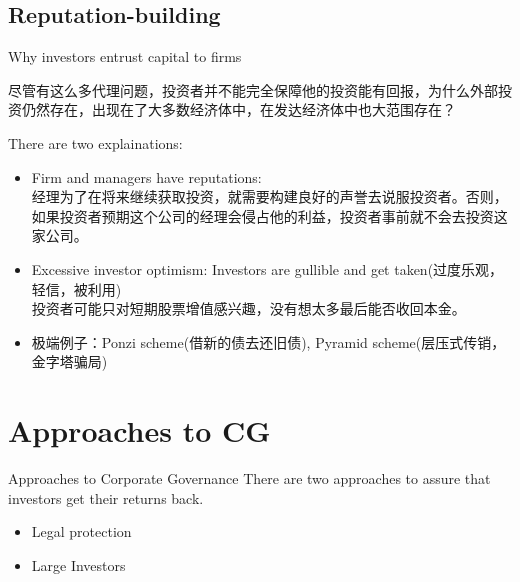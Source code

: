 \subsection{Reputation-building}
	\begin{frame}{Why investors entrust capital to firms}

尽管有这么多代理问题，投资者并不能完全保障他的投资能有回报，为什么外部投资仍然存在，出现在了大多数经济体中，在发达经济体中也大范围存在？
\end{frame}

	\begin{frame}
There are two explainations:
		\begin{itemize}
		\item Firm and managers have reputations:\\
		经理为了在将来继续获取投资，就需要构建良好的声誉去说服投资者。否则，如果投资者预期这个公司的经理会侵占他的利益，投资者事前就不会去投资这家公司。
		\item Excessive investor optimism: Investors are gullible and get taken(过度乐观，轻信，被利用)\\
		投资者可能只对短期股票增值感兴趣，没有想太多最后能否收回本金。
		\item 极端例子：Ponzi scheme(借新的债去还旧债), Pyramid scheme(层压式传销，金字塔骗局)
		\end{itemize}

\end{frame}


%
\section{Approaches to CG}

%
\begin{frame}{Approaches to Corporate Governance}
	There are two approaches to assure that investors get their returns back.
\begin{itemize}
	\item Legal protection
	\item Large Investors
\end{itemize}

\end{frame}
%
